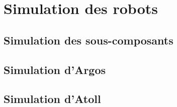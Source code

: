 \chapter{Simulation des robots}

  \section{Simulation des sous-composants}

  \section{Simulation d'Argos}

  \section{Simulation d'Atoll}